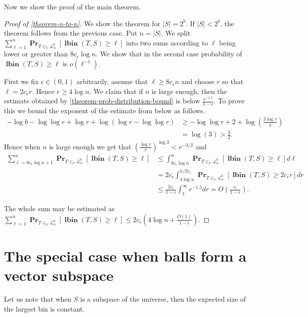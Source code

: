 \documentclass[unicode,review]{siamart1116}
\newcommand{\lbin}[2]{\operatorname{\mathbf{lbin}}({#1}, {#2})}
\newcommand{\linearmaps}[2]{\mathcal{L}_{#1}^{#2}}
\newcommand{\probs}[2]{\operatorname{\mathbf{Pr}}_{{#1}}\left[{#2}\right]}
\numberwithin{theorem}{section}
\begin{document}
Now we show the proof of the main theorem.

\begin{proof}[Proof of \cref{theorem-n-to-n}]
We show the theorem for $|S| = 2^b$.
If $|S| < 2^b$, the theorem follows from the previous case.
Put $n = |S|$.
We split $\sum_{\ell = 1}^{n} \probs{T\in_U\linearmaps{u}{b}}{\lbin{T}{S} \geq \ell}$ into two sums according to $\ell$ being lower or greater than $8c_\epsilon \log n$.
We show that in the second case probability of $\lbin{T}{S} \geq \ell$ is $o(\ell^{-1})$.

First we fix $\epsilon \in (0, 1)$ arbitrarily, assume that $\ell \geq 8c_\epsilon n$ and choose $r$ so that $\ell = 2 c_\epsilon r$.
Hence $r \geq 4\log n$.
We claim that if $n$ is large enough, then the estimate obtained by \cref{theorem-prob-distribution-bound} is below $\frac{r^{-1.5}}{1-\epsilon}$.
To prove this we bound the exponent of the estimate from below as follows.
\begin{align*}
-\log b - \log \log r + \log r + \log (\log r - \log \log r) 
	& \geq -\log \log r + 2 + \log \left(\frac{3\log r}{4}\right) \\
	& = \log(3) > \frac{3}{2}.
\end{align*}
Hence when $n$ is large enough we get that $\left(\frac{\log r}{r}\right)^{\log 3} < r^{-3/2}$ and
\begin{align*}
\sum_{\ell = 8c_\epsilon \log n + 1}^{n} \probs{T\in_U\linearmaps{u}{b}}{\lbin{T}{S} \geq \ell} 
	& \leq \int_{8c_\epsilon \log n}^{n} \probs{T\in_U\linearmaps{u}{b}}{\lbin{T}{S} \geq \ell} d\ell \\
	& = 2c_\epsilon \int_{4 \log n}^{n/2c_\epsilon} \probs{T\in_U\linearmaps{u}{b}}{\lbin{T}{S} \geq 2c_\epsilon r} dr \\
	& \leq \frac{2c_\epsilon}{1-\epsilon} \int_{1}^{\infty} r^{-1.5} dr = O\left(\frac{c_\epsilon}{1-\epsilon}\right).
\end{align*}

The whole sum may be estimated as $
\sum_{\ell = 1}^{n} \probs{T\in_U\linearmaps{u}{b}}{\lbin{T}{S} \geq \ell} \leq 2c_\epsilon \left(4 \log n + \frac{O(1)}{1-\epsilon}\right).$
\end{proof}

\section{The special case when balls form a vector subspace}

Let us note that when $S$ is a subspace of the universe, then the expected size of the largest bin is constant.
\end{document}

